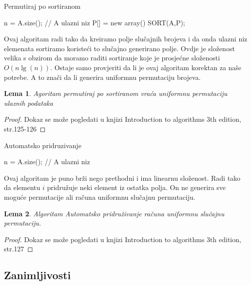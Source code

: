 \documentclass[10pt,a4paper]{article}
\newtheorem{lema}{Lema}
\begin{document}
\begin{algorithm}[H]
\caption{Permutiraj po sortiranom}
n = A.size(); // A ulazni niz\;
P[] = new array()\;
SORT(A,P);
\end{algorithm}

Ovaj algoritam radi tako da kreiramo polje slučajnih brojeva i da onda ulazni niz elemenata sortiramo koristeći to slučajno generirano polje. Ovdje je složenost velika
s obzirom da moramo raditi sortiranje koje je prosjećne složenosti $O(n\lg(n))$.
Ostaje samo provjeriti da li je ovaj algoritam korektan za naše potrebe. A to znači da li generira uniformnu permutaciju brojeva.
\begin{lema}
Agoritam permutiraj po sortiranom vraća uniformnu permutaciju ulaznih podataka
\end{lema}
\begin{proof}
Dokaz se može pogledati u knjizi Introduction to algorithms 3th edition, str.125-126
\end{proof}

\begin{algorithm}[H]
\caption{Automatsko pridruzivanje}
n = A.size(); // A ulazni niz\;
\end{algorithm}
Ovaj algoritam je puno brži nego prethodni i ima linearnu složenost. Radi tako da elementu $i$ pridružuje neki element iz ostatka polja. On ne generira sve moguće permutacije ali računa uniformnu slučajnu permutaciju.
\begin{lema}
Algoritam Automatsko pridruživanje računa uniformnu slučajnu permutaciju.
\end{lema}
\begin{proof}
Dokaz se može pogledati u knjizi Introduction to algorithms 3th edition, str.127
\end{proof}
\subsection{Zanimljivosti}
\end{document}
